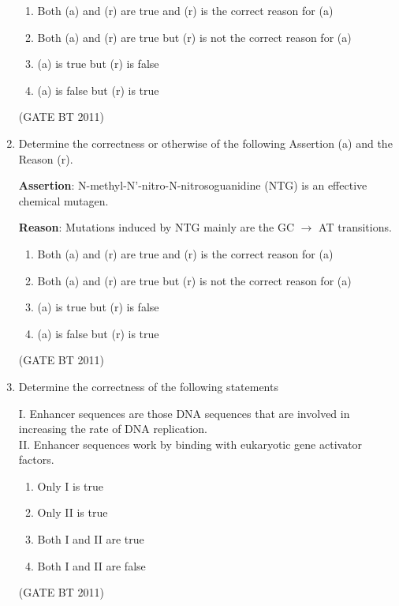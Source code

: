 \documentclass[journal,12pt,onecolumn]{IEEEtran}
\begin{document}
\begin{enumerate}
\begin{enumerate}
  \item Both (a) and (r) are true and (r) is the correct reason for (a)  
  \item Both (a) and (r) are true but (r) is not the correct reason for (a)  
  \item (a) is true but (r) is false  
  \item (a) is false but (r) is true  
\end{enumerate}
\hfill(GATE BT 2011)

\item Determine the correctness or otherwise of the following Assertion (a) and the Reason (r).  

\textbf{Assertion}:   N-methyl-N'-nitro-N-nitrosoguanidine (NTG) is an effective chemical mutagen.  

\textbf{Reason}:   Mutations induced by NTG mainly are the GC $\rightarrow$ AT transitions.  

\begin{enumerate}
  \item Both (a) and (r) are true and (r) is the correct reason for (a)  
  \item Both (a) and (r) are true but (r) is not the correct reason for (a)  
  \item (a) is true but (r) is false  
  \item (a) is false but (r) is true  
\end{enumerate}
\hfill(GATE BT 2011)



\item Determine the correctness of the following statements  

I. Enhancer sequences are those DNA sequences that are involved in increasing the rate of DNA replication. \\ 
II. Enhancer sequences work by binding with eukaryotic gene activator factors.  

\begin{multicols}{2}
\begin{enumerate}
  \item Only I is true  
  \item Only II is true  
  \item Both I and II are true  
  \item Both I and II are false  
\end{enumerate}
\end{multicols} \hfill(GATE BT 2011)


\end{enumerate}
\end{document}
